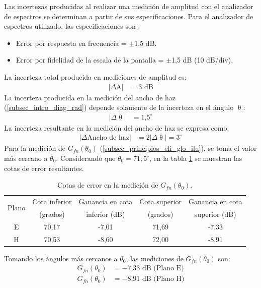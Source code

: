 Las incertezas producidas al realizar una medición de amplitud con el analizador de espectros \cite{Agilent_an_esp_err} se determinan a partir de sus especificaciones. Para el analizador de espectros utilizado, las especificaciones son \cite{LPT_ana_esp_man}:
\begin{itemize}
\item Error por respuesta en frecuencia = $\pm$1,5 dB.
\item Error por fidelidad de la escala de la pantalla = $\pm$1,5 dB (10 dB/div).
\end{itemize}
La incerteza total producida en mediciones de amplitud es:
\begin{align*}
\left|\Delta\text{A}\right| &= 3 \text{ dB}
\end{align*}
La incerteza producida en la medición del ancho de haz (\ref{subsec_intro_diag_rad}) depende solamente de la incerteza en el ángulo $\uptheta$:
\begin{align*}
\left|\Delta\uptheta\right| &= \text{1,5}^{\circ}
\end{align*}
La incerteza resultante en la medición del ancho de haz se expresa como:
\begin{align*}
\left|\Delta\text{Ancho de haz}\right| &= 2\left|\Delta\uptheta\right| = 3^{\circ}
\end{align*}
Para la medición de $G_{fn}\left(\theta_0\right)$ (\ref{subsec_principios_efi_glo_ilu}), se toma el valor más cercano a  $\theta_0$. Considerando que  $\theta_0 = 71,5^{\circ}$, en la tabla \ref{tabla_apE:2} se muestran las cotas de error resultantes.
\begin{table}[H]
\centering
\begin{tabular}{|c|c|c|c|c|}
\hline
\multirow{2}{*}{Plano} & Cota inferior & Ganancia en cota & Cota superior & Ganancia en cota\\
& (grados) & inferior (dB) & (grados) & superior (dB)\\
\hline
E & 70,17 & -7,01 & 71,69 & -7,33\\
\hline
H & 70,53 & -8,60 & 72,00 & -8,91\\
\hline
\end{tabular}
\caption{Cotas de error en la medición de $G_{fn}\left(\theta_0\right)$.}
\label{tabla_apE:2}
\end{table}
Tomando los ángulos más cercanos a $\theta_0$, las mediciones de $G_{fn}\left(\theta_0\right)$ son:
\begin{align*}
G_{fn}\left(\theta_0\right) &= -\text{7,33 dB (Plano E)}\\
G_{fn}\left(\theta_0\right) &= -\text{8,91 dB (Plano H)}
\end{align*}
